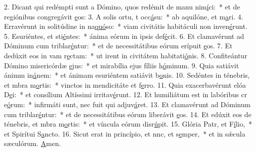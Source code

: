 2. Dicant qui redémpti sunt a Dómino, quos redémit de manu nim\uline{í}ci:~* et de regiónibus congregávit \uline{e}os:
3. A solis ortu, t occ\uline{á}su:~* ab aquilóne, et m\uline{a}ri.
4. Erravérunt in solitúdine in na\uline{quó}so:~* viam civitátis habitáculi non inven\uline{é}runt.
5. Esuriéntes, et sti\uline{é}ntes:~* ánima eórum in ipsis def\uline{é}cit.
6. Et clamavérunt ad Dóminum cum triblar\uline{é}ntur:~* et de necessitátibus eórum erípuit \uline{e}os.
7. Et dedúxit eos in vam r\uline{e}ctam:~* ut irent in civitátem habitati\uline{ó}nis.
8. Confiteántur Dómino misericórdæ \uline{e}jus:~* et mirabília ejus fíliis h\uline{ó}minum.
9. Quia satiávit ánimm in\uline{á}nem:~* et ánimam esuriéntem satiávit b\uline{o}nis.
10. Sedéntes in ténebris, et mbra m\uline{o}rtis:~* vinctos in mendicitáte et f\uline{e}rro.
11. Quia exacerbavérunt elóa D\uline{e}i:~* et consílium Altíssimi irritav\uline{é}runt.
12. Et humiliátum est in labóribus cr e\uline{ó}rum:~* infirmáti sunt, nec fuit qui adjuv\uline{á}ret.
13. Et clamavérunt ad Dóminum cum triblar\uline{é}ntur:~* et de necessitátibus eórum liberávit \uline{e}os.
14. Et edúxit eos de ténebris, et mbra m\uline{o}rtis:~* et víncula eórum disr\uline{ú}pit.
15. Glória Patr, et F\uline{í}lio,~* et Spirítui S\uline{a}ncto.
16. Sicut erat in princípio, et nnc, et s\uline{e}mper,~* et in sǽcula sæculórum. \uline{A}men.
